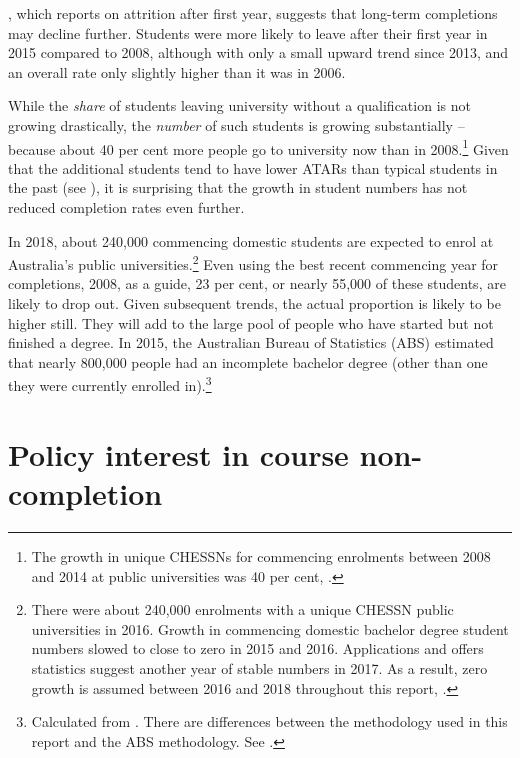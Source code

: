 , which reports on attrition after first year, suggests that long-term completions may decline further. Students were more likely to leave after their first year in 2015 compared to 2008, although with only a small upward trend since 2013, and an overall rate only slightly higher than it was in 2006.

While the \emph{share} of students leaving university without a qualification is not growing drastically, the \emph{number} of such students is growing substantially -- because about 40 per cent more people go to university now than in 2008.\footnote{The growth in unique CHESSNs for commencing enrolments between 2008 and 2014 at public universities was 40 per cent, \textcite{DepartmentofEducationandTraininga}.} Given that the additional students tend to have lower ATARs than typical students in the past (see ), it is surprising that the growth in student numbers has not reduced completion rates even further.

In 2018, about 240,000 commencing domestic students are expected to enrol at Australia's public universities.\footnote{There were about 240,000 enrolments with a unique CHESSN public universities in 2016. Growth in commencing domestic bachelor degree student numbers slowed to close to zero in 2015 and 2016. Applications and offers statistics suggest another year of stable numbers in 2017. As a result, zero growth is assumed between 2016 and 2018 throughout this report, \textcite{DepartmentofEducationandTraining2017b}.} 
Even using the best recent commencing year for completions, 2008, as a guide, 23 per cent, or nearly 55,000 of these students, are likely to drop out. Given subsequent trends, the actual proportion is likely to be higher still. They will add to the large pool of people who have started but not finished a degree. In 2015, the Australian Bureau of Statistics (ABS) estimated that nearly 800,000 people had an incomplete bachelor degree (other than one they were currently enrolled in).\footnote{Calculated from \textcite{ABS2016f}. There are differences between the methodology used in this report and the ABS methodology. See \textcite[][section~1.2]{Cherastidtham2018a}.}

\section{Policy interest in course non-completion}\label{sec:1.4}

